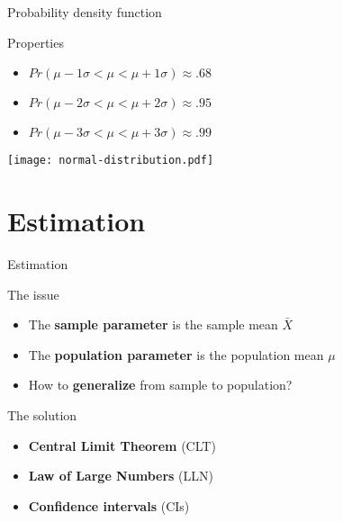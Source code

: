 \documentclass[t]{beamer}
\begin{document}
	\begin{frame}[t]{Probability density function}
	
	\begin{block}{Properties}	
		\begin{itemize}
			\item $Pr(\mu - 1\sigma < \mu < \mu + 1\sigma) \approx .68$
			\item $Pr(\mu - 2\sigma < \mu < \mu + 2\sigma) \approx .95$
			\item $Pr(\mu - 3\sigma < \mu < \mu + 3\sigma) \approx .99$
		\end{itemize}
	\end{block}
	
	\begin{center}
		\texttt{[image: normal-distribution.pdf]}
	\end{center}
		
	\end{frame}

	\section{Estimation}
	
	\begin{frame}[t]{Estimation}

		\begin{block}{The issue}
			\begin{itemize}
				\item The \textbf{sample parameter} %
					is the sample mean $\bar X$
				\item The \textbf{population parameter} %
					is the population mean $\mu$
				\item How to \textbf{generalize} %
					from sample to population?
			\end{itemize}
		\end{block}
		
		\begin{block}{The solution}
			\begin{itemize}
				\item \textbf{Central Limit Theorem} (CLT)
				\item \textbf{Law of Large Numbers} (LLN)
				\item \textbf{Confidence intervals} (CIs)
			\end{itemize}
		\end{block}
		
	\end{frame}
\end{document}

